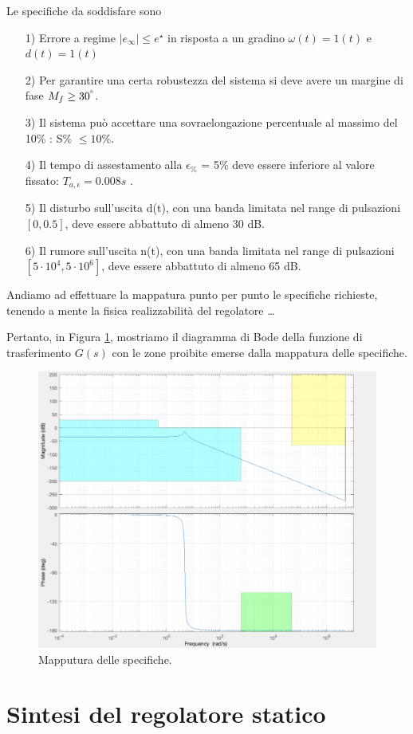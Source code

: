 \documentclass[a4paper, 11pt]{article}
\begin{document}
Le specifiche da soddisfare sono
\begin{itemize}
	\item[1)] Errore a regime $|e_{\infty}| \leq e^{\star}$ in risposta a un gradino $\omega (t) = 1(t)$ e $d(t)=1(t)$
	\item[2)] Per garantire una certa robustezza del sistema si deve avere un margine di fase $M_f \geq 30^{\degree}$.
	\item[3)] Il sistema può accettare una sovraelongazione percentuale al massimo del 10\% : S\% $\leq 10\%$.
	\item[4)] Il tempo di assestamento alla $\epsilon_{\%}$ = 5\% deve essere inferiore al valore fissato: $T_{a, \epsilon} = 0.008s$ .
	\item[5)] Il disturbo sull'uscita d(t), con una banda limitata nel range di pulsazioni $[0, 0.5]$, deve essere abbattuto di almeno 30 dB.
	\item[6)] Il rumore sull'uscita n(t), con una banda limitata nel range di pulsazioni $[5 \cdot 10^4, 5 \cdot 10^6]$, deve essere abbattuto di almeno 65 dB.
\end{itemize}
%
Andiamo ad effettuare la mappatura punto per punto le specifiche richieste, tenendo a mente la fisica realizzabilità del regolatore \dots  

Pertanto, in Figura \ref{fig:G_bode_specifiche}, mostriamo il diagramma di Bode della funzione di trasferimento $G(s)$ con le zone proibite emerse dalla mappatura delle specifiche.
\begin{figure}[h!]
	\centering
	\includegraphics[width=0.75\linewidth]{./images/bode_G_mappatura.png}
	\caption{Mapputura delle specifiche.}
	\label{fig:G_bode_specifiche}
\end{figure}

\section{Sintesi del regolatore statico}
\label{sec:static_regulator}
\end{document}
